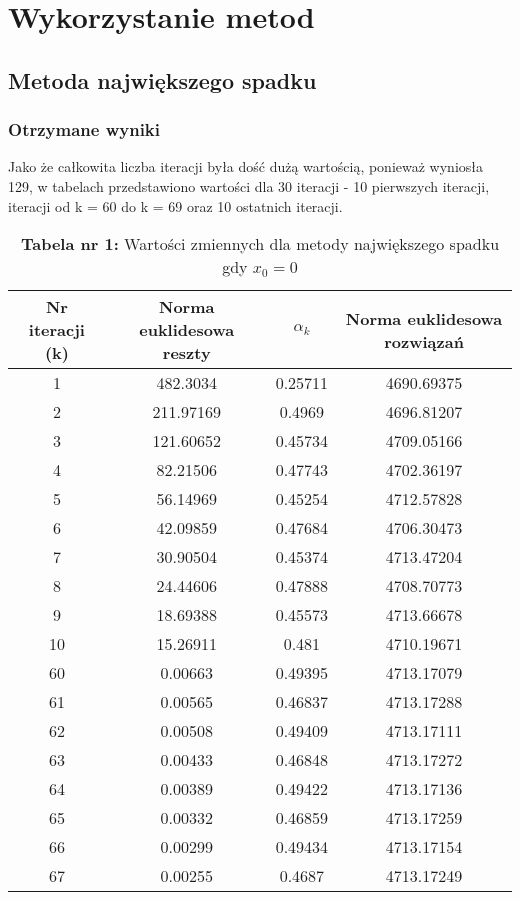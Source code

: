 \documentclass{article}
\begin{document}
\section{Wykorzystanie metod}
\subsection{Metoda największego spadku}
\subsubsection{Otrzymane wyniki}
Jako że całkowita liczba iteracji była dość dużą wartością, ponieważ wyniosła 129, w tabelach przedstawiono wartości dla 30 iteracji - 10 pierwszych iteracji, iteracji od k = 60 do k = 69 oraz 10 ostatnich iteracji. 
\begin{table}[htbp]
\centering
\caption*{\textbf{Tabela nr 1:} Wartości zmiennych dla metody największego spadku gdy $x_0 = 0$}
\label{tab:moja_tabela}
\begin{tabular}{cccc}
\toprule
Nr iteracji (k) & Norma euklidesowa reszty & $\alpha_k$ & Norma euklidesowa rozwiązań \\
\midrule
1 & 482.3034 & 0.25711 & 4690.69375 \\
2 & 211.97169 & 0.4969 & 4696.81207 \\
3 & 121.60652 & 0.45734 & 4709.05166 \\
4 & 82.21506 & 0.47743 & 4702.36197 \\
5 & 56.14969 & 0.45254 & 4712.57828 \\
6 & 42.09859 & 0.47684 & 4706.30473 \\
7 & 30.90504 & 0.45374 & 4713.47204 \\
8 & 24.44606 & 0.47888 & 4708.70773 \\
9 & 18.69388 & 0.45573 & 4713.66678 \\
10 & 15.26911 & 0.481 & 4710.19671 \\
\midrule
60 & 0.00663 & 0.49395 & 4713.17079 \\
61 & 0.00565 & 0.46837 & 4713.17288 \\
62 & 0.00508 & 0.49409 & 4713.17111 \\
63 & 0.00433 & 0.46848 & 4713.17272 \\
64 & 0.00389 & 0.49422 & 4713.17136 \\
65 & 0.00332 & 0.46859 & 4713.17259 \\
66 & 0.00299 & 0.49434 & 4713.17154 \\
67 & 0.00255 & 0.4687 & 4713.17249 \\

\end{tabular}
\end{table}
\end{document}
